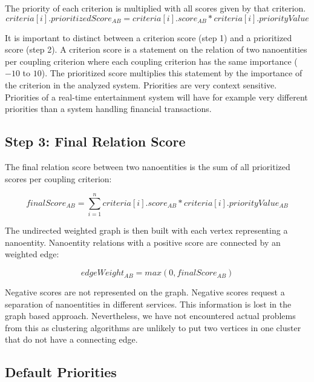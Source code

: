 The priority of each criterion is multiplied with all scores given by that criterion. 
\begin{displaymath}
	criteria[i].prioritizedScore_{AB} = criteria[i].score_{AB} * criteria[i].priorityValue
\end{displaymath}

It is important to distinct between a criterion score (step 1) and a prioritized score (step 2). A criterion score is a statement on the relation of two nanoentities per coupling criterion where each coupling criterion has the same importance ($-10$ to $10$). The prioritized score multiplies this statement by the importance of the criterion in the analyzed system. Priorities are very context sensitive. Priorities of a real-time entertainment system will have for example very different priorities than a system handling financial transactions. 

\subsection{Step 3: Final Relation Score}

The final relation score between two nanoentities is the sum of all prioritized scores per coupling criterion: 

\begin{displaymath}
finalScore_{AB} = \sum\limits_{i=1}^n criteria[i].score_{AB} * criteria[i].priorityValue_{AB}
\end{displaymath}

The undirected weighted graph is then built with each vertex representing a nanoentity. Nanoentity relations with a positive score are connected by an weighted edge:

\begin{displaymath}
edgeWeight_{AB} = max(0, finalScore_{AB})	
\end{displaymath}

Negative scores are not represented on the graph. Negative scores request a separation of nanoentities in different services. This information is lost in the graph based approach. Nevertheless, we have not encountered actual problems from this as clustering algorithms are unlikely to put two vertices in one cluster that do not have a connecting edge.
	
\subsection{Default Priorities}

